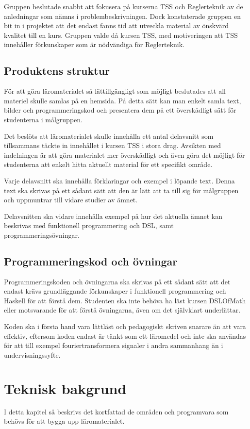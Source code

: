 \documentclass[]{article}
\begin{document}
Gruppen beslutade snabbt att fokusera på kurserna TSS och Reglerteknik av de
anledningar som nämns i problembeskrivningen. Dock konstaterade gruppen en bit
in i projektet att det endast fanns tid att utveckla material av önskvärd
kvalitet till en kurs. Gruppen valde då kursen TSS, med motiveringen att
TSS innehåller förkunskaper som är nödvändiga för Reglerteknik.

\subsection{Produktens struktur}
För att göra läromaterialet så lättillgängligt som möjligt beslutades att
all materiel skulle samlas på en hemsida. På detta sätt kan man enkelt
samla text, bilder och programmeringskod och presentera dem på ett
överskådligt sätt för studenterna i målgruppen.

Det beslöts att läromaterialet skulle innehålla ett antal delavsnitt som
tillsammans täckte in innehållet i kursen TSS i stora drag.
Avsikten med indelningen är att göra materialet mer överskådligt och
även göra det möjligt för studenterna att enkelt hitta aktuellt material
för ett specifikt område.

Varje delavsnitt ska innehålla förklaringar och exempel i löpande text.
Denna text ska skrivas på ett sådant sätt att den är lätt att ta till
sig för målgruppen och uppmuntrar till vidare studier av ämnet.

Delavsnitten ska vidare innehålla exempel på hur det aktuella ämnet kan
beskrivas med funktionell programmering och DSL, samt programmeringsövningar.

\subsection{Programmeringskod och övningar}

Programmeringskoden och övningarna ska skrivas på ett sådant sätt att det endast krävs grundläggande förkunskaper i
funktionell programmering och Haskell för att förstå dem. Studenten ska inte behöva ha läst kursen DSLOfMath eller
motsvarande för att förstå övningarna, även om det självklart underlättar.

Koden ska i första hand vara lättläst och pedagogiskt skriven snarare än att vara effektiv, eftersom koden endast är
tänkt som ett läromedel och inte ska användas för att till exempel fouriertransformera signaler i andra sammanhang än i
undervisningssyfte.


\section{Teknisk bakgrund}
I detta kapitel så beskrivs det kortfattad de områden och programvara som
behövs för att bygga upp läromaterialet.
\end{document}
